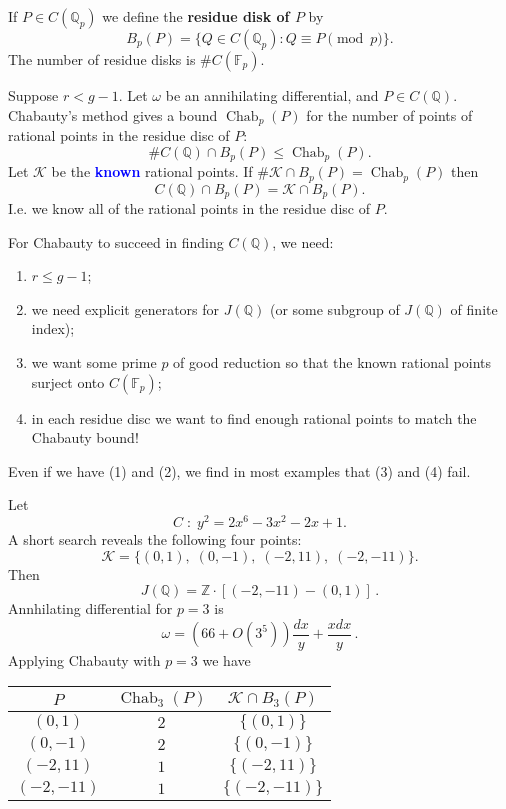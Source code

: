 \documentclass{beamer}
\DeclareMathOperator{\Chab}{Chab}
\newcommand{\Q}{{\mathbb Q}}
\newcommand{\Z}{{\mathbb Z}}
\newcommand{\F}{{\mathbb F}}
\newcommand{\cK}{\mathcal{K}}
\theoremstyle{definition}
\theoremstyle{remark}
\begin{document}
\begin{frame}
If $P \in C(\Q_p)$ we define the \textbf{residue disk of $P$} by
\[
B_p(P) = \{ Q \in C(\Q_p) : Q \equiv P \pmod{p} \}.
\]
The number of residue disks is $\# C(\F_p)$.

Suppose $r < g-1$. Let $\omega$ be an annihilating differential,
and $P \in C(\Q)$. Chabauty's method gives a bound
$\Chab_p(P)$
for the number of points of rational points in the residue
disc of $P$:
\[
\# C(\Q) \cap B_p(P) \le \Chab_p(P).
\]
Let $\cK$ be the \textcolor{blue}{\textbf{known}} rational points. If $\# \cK \cap B_p(P) =
\Chab_p(P)$ then
\[
C(\Q) \cap B_p(P) =\cK \cap B_p(P). 
\]
I.e. we know all of the rational points in the residue disc of $P$.
\end{frame}
\begin{frame}
For Chabauty to succeed in finding $C(\Q)$, we need:
\begin{enumerate}
\item $r\le g-1$;
\item we need explicit generators for $J(\Q)$ (or some
subgroup of $J(\Q)$ of finite index);
\item we want some prime $p$ of good reduction so that
the known rational points surject onto $C(\F_p)$; 
\item  in each residue disc we want to find enough rational
points to match the Chabauty bound!
\end{enumerate}

Even if we have (1) and (2), we find in most examples that
(3) and (4) fail. 
\end{frame}
\begin{frame}
Let
\[
C \; : \; y^2=2x^6-3x^2-2x+1.
\]
A short search reveals the following four points:
\[
\cK=\{ (0,1),\; (0,-1), \; (-2,11),\; (-2,-11) \}.
\]
Then 
\[
J(\Q) = \Z \cdot [ (-2,-11) - (0,1)] \, .
\]
Annhilating differential for $p=3$ is
\[
\omega=
(66+O(3^5)) \frac{dx}{y} + \frac{x dx}{y} \, .\]
%
Applying Chabauty with $p=3$ we have

\begin{tabular}{|c|c|c|}
\hline
$P$ & $\Chab_3(P)$ & $\cK \cap B_3(P)$ \\
\hline
$(0,1)$ & $2$ & $\{(0,1)\}$ \\
$(0,-1)$ & $2$ & $\{(0,-1)\}$ \\
$(-2,11)$ & $1$ & $\{(-2,11)\}$\\
$(-2,-11)$ & $1$ & $ \{(-2,-11)\}$\\
\hline
\end{tabular}

\end{frame}
\end{document}
